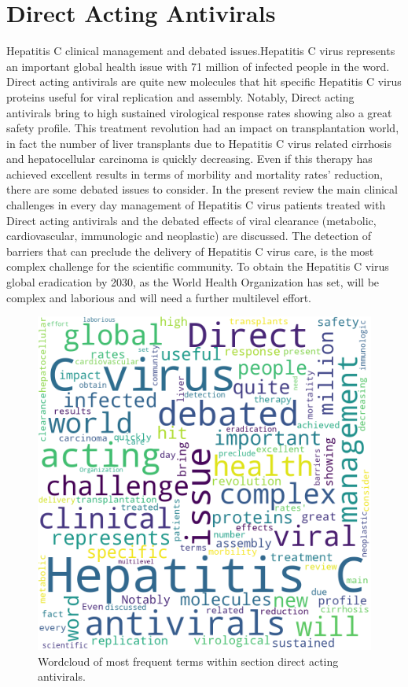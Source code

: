 \documentclass{qqtarticle}
\begin{document}
    \section{Direct Acting Antivirals}
        Hepatitis C  clinical management and debated issues.Hepatitis C virus represents an important global health issue with 71 million of infected people in the word. Direct acting antivirals are quite new molecules that hit specific Hepatitis C virus proteins useful for viral replication and assembly. Notably, Direct acting antivirals bring to high sustained virological response rates showing also a great safety profile. This treatment revolution had an impact on transplantation world, in fact the number of liver transplants due to Hepatitis C virus related cirrhosis and hepatocellular carcinoma is quickly decreasing. Even if this therapy has achieved excellent results in terms of morbility and mortality rates' reduction, there are some debated issues to consider. In the present review the main clinical challenges in every day management of Hepatitis C virus patients treated with Direct acting antivirals and the debated effects of viral clearance (metabolic, cardiovascular, immunologic and neoplastic) are discussed. The detection of barriers that can preclude the delivery of Hepatitis C virus care, is the most complex challenge for the scientific community. To obtain the Hepatitis C virus global eradication by 2030, as the World Health Organization has set, will be complex and laborious and will need a further multilevel effort.

    \begin{figure}[H]
        \centering
        \includegraphics[width=.75\linewidth]{img/directactingantivirals.png}
        \caption{Wordcloud of most frequent terms within section direct acting antivirals.}
        \label{fig:wcl_directactingantivirals}
    \end{figure}
\end{document}
